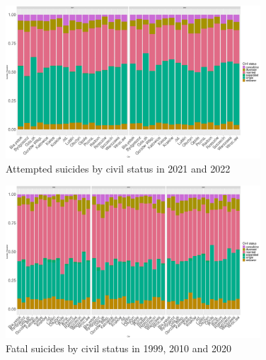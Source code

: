 \documentclass{article}
\begin{document}
\begin{figure}[H]
    \centering
    \includegraphics[width=0.85\textwidth]{imgs/status_city_att_suicides-2122.pdf}
    \caption{Attempted suicides by civil status  in 2021 and 2022}
    \label{fig:status_city_att_suicides-2122}
\end{figure}

\begin{figure}[H]
    \centering
    \includegraphics[width=0.85\textwidth]{imgs/status_city_fat_suicides-991020.pdf}
    \caption{Fatal suicides by civil status  in 1999, 2010 and 2020}
    \label{fig:status_city_fat_suicides-991020}
\end{figure}
\end{document}
